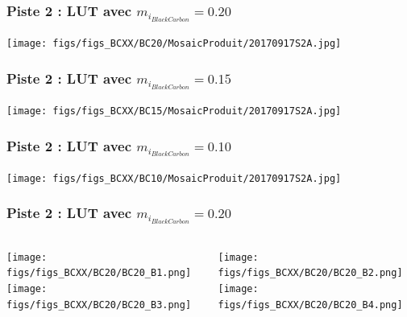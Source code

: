\documentclass[8pt]{beamer}
\begin{document}
\begin{frame}
\frametitle{Piste 2 : LUT avec $m_{i_{Black Carbon}} = 0.20$}
	\begin{center}
     	\texttt{[image: figs/figs\_BCXX/BC20/MosaicProduit/20170917S2A.jpg]}
    \end{center}		
\end{frame}

\begin{frame}
\frametitle{Piste 2 : LUT avec $m_{i_{Black Carbon}} = 0.15$}
	\begin{center}
     	\texttt{[image: figs/figs\_BCXX/BC15/MosaicProduit/20170917S2A.jpg]}
    \end{center}		
\end{frame}

\begin{frame}
\frametitle{Piste 2 : LUT avec $m_{i_{Black Carbon}} = 0.10$}
	\begin{center}
     	\texttt{[image: figs/figs\_BCXX/BC10/MosaicProduit/20170917S2A.jpg]}
    \end{center}		
\end{frame}

\begin{frame}
\frametitle{Piste 2 : LUT avec $m_{i_{Black Carbon}} = 0.20$}
	\begin{columns}
		\begin{column}{0.5\textwidth}
			\begin{center}
	     		\texttt{[image: figs/figs\_BCXX/BC20/BC20\_B1.png]}	
		     	\texttt{[image: figs/figs\_BCXX/BC20/BC20\_B3.png]}
		    \end{center}		
		    
		\end{column}
		\begin{column}{0.5\textwidth}
			\begin{center}
		     	\texttt{[image: figs/figs\_BCXX/BC20/BC20\_B2.png]}
		     	\texttt{[image: figs/figs\_BCXX/BC20/BC20\_B4.png]}
		    \end{center}				
		\end{column}
	\end{columns}
\end{frame}
\end{document}
